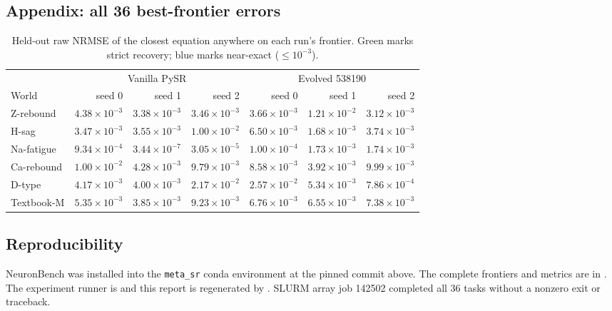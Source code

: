 \documentclass[10pt]{article}
\begin{document}
\begin{landscape}
\section{Appendix: all 36 best-frontier errors}
\begin{table}[h]
\centering
\caption{Held-out raw NRMSE of the closest equation anywhere on each run's frontier.
Green marks strict recovery; blue marks near-exact ($\leq10^{-3}$).}
\normalsize
\setlength{\tabcolsep}{9pt}
\begin{tabular}{lrrrrrr}
\toprule
& \multicolumn{3}{c}{Vanilla PySR} & \multicolumn{3}{c}{Evolved 538190} \\
\cmidrule(lr){2-4}\cmidrule(lr){5-7}
World & seed 0 & seed 1 & seed 2 & seed 0 & seed 1 & seed 2 \\
\midrule
Z-rebound & $4.38\!\times\!10^{-3}$ & $3.38\!\times\!10^{-3}$ & $3.46\!\times\!10^{-3}$ & $3.66\!\times\!10^{-3}$ & $1.21\!\times\!10^{-2}$ & $3.12\!\times\!10^{-3}$ \\
H-sag & $3.47\!\times\!10^{-3}$ & $3.55\!\times\!10^{-3}$ & $1.00\!\times\!10^{-2}$ & $6.50\!\times\!10^{-3}$ & $1.68\!\times\!10^{-3}$ & $3.74\!\times\!10^{-3}$ \\
Na-fatigue & \cellcolor{blue!10}$9.34\!\times\!10^{-4}$ & \cellcolor{green!16}\textbf{$3.44\!\times\!10^{-7}$} & \cellcolor{blue!10}$3.05\!\times\!10^{-5}$ & \cellcolor{blue!10}$1.00\!\times\!10^{-4}$ & $1.73\!\times\!10^{-3}$ & $1.74\!\times\!10^{-3}$ \\
Ca-rebound & $1.00\!\times\!10^{-2}$ & $4.28\!\times\!10^{-3}$ & $9.79\!\times\!10^{-3}$ & $8.58\!\times\!10^{-3}$ & $3.92\!\times\!10^{-3}$ & $9.99\!\times\!10^{-3}$ \\
D-type & $4.17\!\times\!10^{-3}$ & $4.00\!\times\!10^{-3}$ & $2.17\!\times\!10^{-2}$ & $2.57\!\times\!10^{-2}$ & $5.34\!\times\!10^{-3}$ & \cellcolor{blue!10}$7.86\!\times\!10^{-4}$ \\
Textbook-M & $5.35\!\times\!10^{-3}$ & $3.85\!\times\!10^{-3}$ & $9.23\!\times\!10^{-3}$ & $6.76\!\times\!10^{-3}$ & $6.55\!\times\!10^{-3}$ & $7.38\!\times\!10^{-3}$ \\
\bottomrule
\end{tabular}
\end{table}

\vspace{1em}
\begin{minipage}{0.9\linewidth}
\subsection*{Reproducibility}
{\small NeuronBench was installed into the \texttt{meta\_sr} conda environment at the pinned commit above.
The complete frontiers and metrics are in
. The experiment runner is
 and this report is regenerated by
. SLURM array job 142502 completed all 36 tasks
without a nonzero exit or traceback.}
\end{minipage}
\end{landscape}
\end{document}
